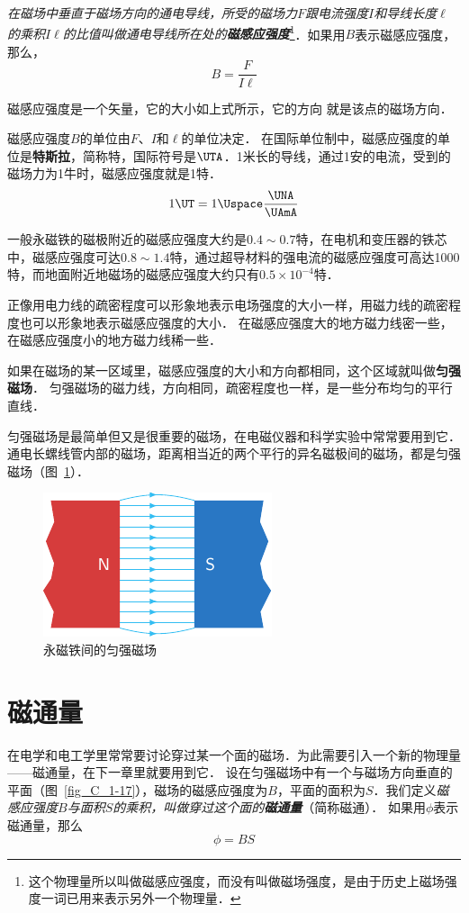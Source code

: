 \textit{在磁场中垂直于磁场方向的通电导线，所受的磁场力$F$跟电流强度$I$和导线长度$\ell$的乘积$I\ell$的比值叫做通电导线所在处的\textbf{磁感应强度}}\footnote{这个物理量所以叫做磁感应强度，而没有叫做磁场强度，是由于历史上磁场强度一词已用来表示另外一个物理量．}．如果用$B$表示磁感应强度，那么，
\[B=\frac{F}{I\ell}\]

磁感应强度是一个矢量，它的大小如上式所示，它的方向
就是该点的磁场方向．

磁感应强度$B$的单位由$F$、$I$和$\ell$的单位决定．
在国际单位制中，磁感应强度的单位是\textbf{特斯拉}，简称特，国际符号是$ \UTA $．1米长的导线，通过1安的电流，受到的磁场力为1牛时，磁感应强度就是1特．
\[1\UT =1 \Uspace \frac{\UNA}{\UAmA}\]

一般永磁铁的磁极附近的磁感应强度大约是$0.4 \sim 0.7$特，在电机和变压器的铁芯中，磁感应强度可达$0.8 \sim 1.4$特，通过超导材料的强电流的磁感应强度可高达1000特，而地面附近地磁场的磁感应强度大约只有$0.5\times 10^{-4}$特．

正像用电力线的疏密程度可以形象地表示电场强度的大小一样，用磁力线的疏密程度也可以形象地表示磁感应强度的大小．
在磁感应强度大的地方磁力线密一些，在磁感应强度小的地方磁力线稀一些．

如果在磁场的某一区域里，磁感应强度的大小和方向都相同，这个区域就叫做\textbf{匀强磁场}．
匀强磁场的磁力线，方向相同，疏密程度也一样，是一些分布均匀的平行直线．

匀强磁场是最简单但又是很重要的磁场，在电磁仪器和科学实验中常常要用到它．
通电长螺线管内部的磁场，距离相当近的两个平行的异名磁极间的磁场，都是匀强磁场（图~\ref{fig_C_1-16}）．

\begin{figure}[htbp]
    \centering
    \includegraphics{fig/C/1-16.pdf}
    \caption{永磁铁间的匀强磁场}\label{fig_C_1-16}
\end{figure}

\section{磁通量}
在电学和电工学里常常要讨论穿过某一个面的磁场．为此需要引入一个新的物理量——磁通量，在下一章里就要用到它．
设在匀强磁场中有一个与磁场方向垂直的平面（图~\ref{fig_C_1-17}），磁场的磁感应强度为$B$，平面的面积为$S$．我们定义\textit{磁感应强度$B$与面积$S$的乘积，叫做穿过这个面的\textbf{磁通量}}（简称磁通）．
如果用$\phi$表示磁通量，那么
\[\phi=BS \]


